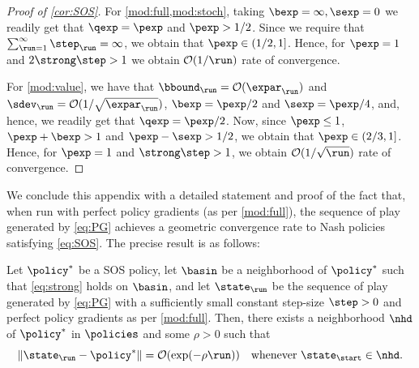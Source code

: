 \begin{proof}[Proof of \cref{cor:SOS}]
For \cref{mod:full,mod:stoch}, taking $\bexp = \infty, \sexp = 0$ we readily get that $\qexp = \pexp$ and $\pexp > 1/2$. Since we require that $\sum_{\run=1}^{\infty}\step_{\run} = \infty$, we obtain that $\pexp \in (1/2,1]$. Hence, for $\pexp = 1$ and $2\strong\step > 1$ we obtain $\bigoh(1/\run)$ rate of convergence.

For \cref{mod:value}, we have that $\curr[\bbound] = \bigoh(\curr[\expar])$ and $\curr[\sdev] = \bigoh(1/\sqrt{\curr[\expar]})$, \ie $\bexp = \pexp/2$ and $\sexp = \pexp/4$, and, hence, we readily get that $\qexp = \pexp/2$. Now, since $\pexp \leq 1$, $\pexp + \bexp >1$ and $\pexp - \sexp > 1/2$, we obtain that $\pexp \in (2/3,1]$. Hence, for $\pexp = 1$ and $\strong\step > 1$, we obtain $\bigoh(1/\sqrt{\run})$ rate of convergence.
\end{proof}

We conclude this appendix with a detailed statement and proof of the fact that, when run with perfect policy gradients (\ie as per \cref{mod:full}), the sequence of play generated by \eqref{eq:PG} achieves a geometric convergence rate to Nash policies satisfying \eqref{eq:SOS}.
The precise result is as follows:

\begin{proposition}
\label{prop:geometric}
Let $\eq$ be a \acl{SOS} policy,
let $\basin$ be a neighborhood of $\eq$ such that \eqref{eq:strong} holds on $\basin$,
and
let $\curr$ be the sequence of play generated by \eqref{eq:PG} with a sufficiently small constant step-size $\step > 0$ and perfect policy gradients as per \cref{mod:full}.
Then, there exists a neighborhood $\nhd$ of $\eq$ in $\policies$ and some $\rho>0$ such that
\begin{equation}
\label{eq:geometric}
\norm{\curr - \eq}
	= \bigoh(\exp(-\rho\run))
	\quad
	\text{whenever $\init\in\nhd$}.
\end{equation}
\end{proposition}

